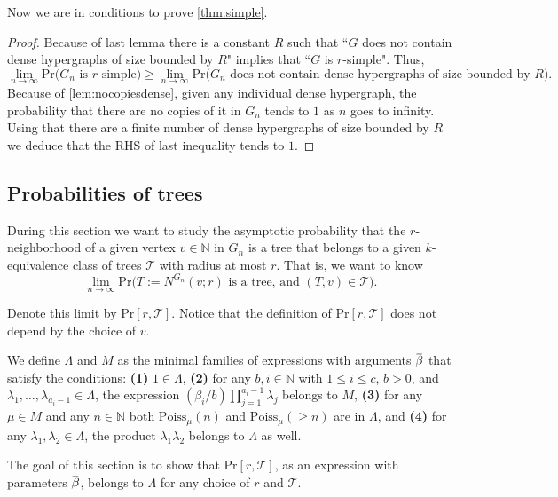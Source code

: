 \documentclass[12pt,notitlepage,a4paper]{article}
\theoremstyle{definition}
\newcommand{\N}{\mathbb{N}}
\newcommand{\Ln}{\lim\limits_{n\to \infty}}
\newcommand{\overbar}[1]{\mkern 1.5mu\overline{\mkern-1.5mu#1\mkern-1.5mu}\mkern 1.5mu}
\begin{document}
Now we are in conditions to prove \cref{thm:simple}.

\begin{proof}
	Because of last lemma there is a constant $R$ such that 
	``$G$ does not contain dense hypergraphs of size bounded by $R$" implies
	that ``$G$ is $r$-simple". Thus,
	\[ \Ln \mathrm{Pr}\big( G_n \text{ is } r \text{-simple}  \big)
	\geq \Ln \mathrm{Pr} \big( G_n \text{ does not contain dense 
	hypergraphs of size bounded by } R\big).\] 
	Because of	\cref{lem:nocopiesdense}, given any individual dense hypergraph,
	the probability that there are no copies
	of it in $G_n$ tends to $1$ as $n$ goes to infinity. Using that
	there are a finite number of dense hypergraphs of size bounded by
	$R$ we deduce that the RHS of last inequality tends to $1$. 
\end{proof}

\subsection{Probabilities of trees}

During this section we want to study
the asymptotic probability that the 
$r$-neighborhood of a given vertex $v\in \N$
in $G_n$ 
is a tree that belongs to a given $k$-equivalence
class of trees $\mathcal{T}$ with radius at most
$r$. That is, we want to know
\[\Ln \mathrm{Pr}\big( 
T:=N^{G_n}(v;r) \text{ is a tree, and } (T,v)\in \mathcal{T} \big). 
\]

Denote this limit by $\mathrm{Pr}[r,\mathcal{T}]$. Notice that the 
definition of  $\mathrm{Pr}[r,\mathcal{T}]$ does not depend by the
choice of $v$.\par

We define $\Lambda$ and $M$ as the minimal families
of expressions with arguments $\overbar{\beta}$ that satisfy
 the conditions: \textbf{(1)} $1\in \Lambda$, \textbf{(2)} 
for any $b,i\in \N$ with $1\leq i \leq c$,
$b > 0$, and $\lambda_1,\dots, \lambda_{a_i-1}\in \Lambda$,
the expression $(\beta_i/b) \prod_{j=1}^{a_i-1}\lambda_j$
belongs to $M$,  \textbf{(3)}
for any $\mu\in M$ and any $n\in \N$ both
$\mathrm{Poiss}_{\mu}(n)$ and $\mathrm{Poiss}_\mu(\geq n)$ are in $\Lambda$, 
and  \textbf{(4)} for any $\lambda_1,\lambda_2 \in \Lambda$, the
product $\lambda_1\lambda_2$ belongs to $\Lambda$ as well.
\par
The goal of this section is to show 
that $\mathrm{Pr}[r,\mathcal{T}]$,
as an expression with parameters
$\overbar{\beta}$, belongs to $\Lambda$ for any choice of 
$r$ and $\mathcal{T}$. \par
\end{document}
